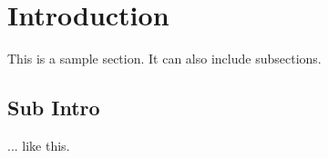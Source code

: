 \section{Introduction}
This is a sample section. It can also include subsections.

\subsection{Sub Intro}
... like this.

